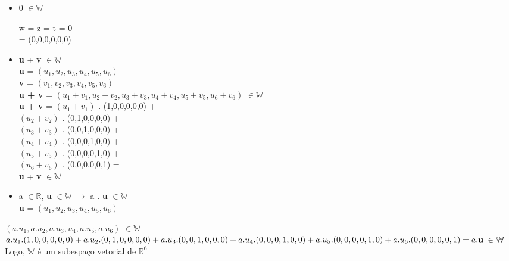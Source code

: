 \documentclass{article}
\begin{document}
\begin{itemize}

    \item 0 $\in \mathbb{W}$\\
\newline

w = z = t = 0\\
 = (0,0,0,0,0,0)\\
\newline
    
    \item \textbf{u} + \textbf{v} $\in \mathbb{W}$\\
\newline
\textbf{u} = $(u_{1}, u_{2}, u_{3}, u_{4}, u_{5}, u_{6})$\\ 
\textbf{v} = $(v_{1}, v_{2}, v_{3}, v_{4}, v_{5}, v_{6})$\\
\newline
\textbf{u + v} = $(u_{1} + v_{1}, u_{2} + v_{2}, u_{3} + v_{3}, u_{4} + v_{4}, u_{5} + v_{5}, u_{6} + v_{6})$ $\in \mathbb{W}$\\
\textbf{u + v} = $(u_{1} + v_{1})$ . (1,0,0,0,0,0) + \\
 $(u_{2} + v_{2})$ . (0,1,0,0,0,0) + \\
 $(u_{3} + v_{3})$ . (0,0,1,0,0,0) + \\
 $(u_{4} + v_{4})$ . (0,0,0,1,0,0) + \\
$(u_{5} + v_{5})$ . (0,0,0,0,1,0) + \\
 $(u_{6} + v_{6})$ . (0,0,0,0,0,1) = \\
\textbf{u} +  \textbf{v} $\in \mathbb{W}$\\

    \item a $\in \mathbb{R}$, \textbf{u} $\in \mathbb{W}$ $\to$ a . \textbf{u} $\in \mathbb{W}$\\
\newline
\textbf{u} = $(u_{1}, u_{2}, u_{3}, u_{4}, u_{5}, u_{6})$\\
\newline
\end{itemize}


$(a . u_{1}, a . u_{2}, a . u_{3}, u_{4}, a . u_{5}, a . u_{6})$ $\in \mathbb{W}$\\
\newline
$
a . u_{1} . (1,0,0,0,0,0) + \\
a . u_{2} . (0,1,0,0,0,0) + \\
a . u_{3} . (0,0,1,0,0,0) + \\
a . u_{4} . (0,0,0,1,0,0) + \\
a . u_{5} . (0,0,0,0,1,0) + \\
a . u_{6} . (0,0,0,0,0,1)  = \\
\newline
a .\textbf{u}$  $\in \mathbb{W}\\
\newline
$
Logo, $\mathbb{W}$ é um subespaço vetorial de $\mathbb{R}^6$\\
\newline
\end{document}
